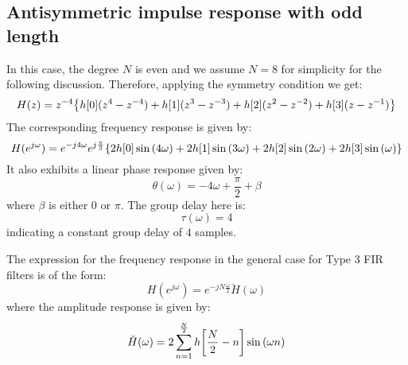 \documentclass[../../main/main.tex]{subfiles}
\begin{document}
\subsection{Antisymmetric impulse response with odd length}
In this case, the degree \( N \) is even and we assume \( N = 8 \) for simplicity for the following discussion. Therefore, applying the symmetry condition we get:
\begin{equation}
    H(z)
    =
    z^{-4}\qty{h[0](z^{4} - z^{-4}) + h[1](z^{3} - z^{-3}) + h[2](z^{2} - z^{-2}) + h[3](z - z^{-1})}
    \label{eq:L20_S28_1}
\end{equation}
The corresponding frequency response is given by:
\begin{equation}
    H(e^{j\omega})
    =
    e^{-j4\omega} e^{j \frac{\pi}{2}} \qty{2h[0]\sin\qty(4\omega) + 2h[1]\sin\qty(3\omega) + 2h[2]\sin\qty(2\omega) + 2h[3]\sin\qty(\omega)}
    \label{eq:L20_S29_1}
\end{equation}
It also exhibits a linear phase response given by:
\begin{equation}
    \theta(\omega)
    =
    -4\omega + \frac{\pi}{2} + \beta
    \label{eq:L20_S29_2}
\end{equation}
where \( \beta \) is either \( 0 \) or \( \pi \). The group delay here is:
\begin{equation}
    \tau(\omega)
    =
    4
    \label{eq:L20_S30_1}
\end{equation}
indicating a constant group delay of \( 4 \) samples.

The expression for the frequency response in the general case for Type 3 FIR filters is of the form:
\begin{equation}
    H(e^{j\omega})
    =
    e^{-jN \frac{\omega}{2}} \breve{H}(\omega)
    \label{eq:L20_S30_2}
\end{equation}
where the amplitude response is given by:
\begin{equation}
    \breve{H}(\omega)
    =
    2 \sum_{n=1}^{\frac{N}{2}} h\qty[\frac{N}{2} - n] \sin\qty(\omega n)
    \label{eq:L20_S30_3}
\end{equation}
\end{document}
